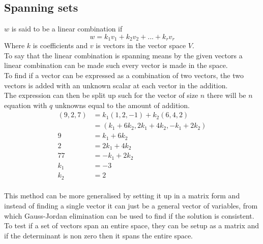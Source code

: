 \documentclass[12pt, a4paper]{article}
\begin{document}
		\subsection{Spanning sets}
			$w$ is said to be a linear combination if 
			$$w=k_1v_1+k_2v_2+...+k_rv_r$$
			Where $k$ is coefficients and $v$ is vectors in the vector space $V$.\\
			To say that the linear combination is spanning means by the given vectors a linear combination can be made such every vector is made in the space.\\
			To find if a vector can be expressed as a combination of two vectors, the two vectors is added with an unknown scalar at each vector in the addition.\\
			The expression can then be split up such for the vector of size $n$ there will be $n$ equation with $q$ unknowns equal to the amount of addition.\\
			\begin{align*}
				(9,2,7)&=k_1(1,2,-1)+k_2(6,4,2)\\
				&=(k_1+6k_2,2k_1+4k_2,-k_1+2k_2)\\[3mm]
				9&=k_1+6k_2\\
				2&=2k_1+4k_2\\
				77&=-k_1+2k_2\\[3mm]
				k_1&=-3\\
				k_2&=2
			\end{align*}\\
			This method can be more generalised by setting it up in a matrix form and instead of finding a single vector it can just be a general vector of variables, from which Gauss-Jordan elimination can be used to find if the solution is consistent.
			To test if a set of vectors span an entire space, they can be setup as a matrix and if the determinant is non zero then it spans the entire space.
\end{document}

